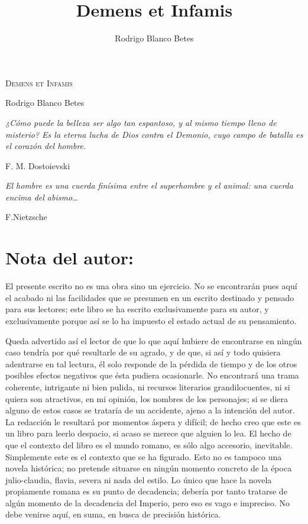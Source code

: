 \documentclass[11pt,openany]{book}
\title{\Huge Demens et Infamis}
\author{Rodrigo Blanco Betes}
\date{}
\begin{document}
\frontmatter
\begin{titlepage}
  \centering
  \vspace*{4cm}
  {\Huge\scshape Demens et Infamis\par}
  \vspace{1.5cm}
  {\Large Rodrigo Blanco Betes\par}
  \vfill
\end{titlepage}

\cleardoublepage
\thispagestyle{empty}
\vspace*{6cm}
\begin{flushright}
  \textit{¿Cómo puede la belleza ser algo tan espantoso, y al mismo tiempo lleno de misterio? Es la eterna lucha de Dios contra el Demonio, cuyo campo de batalla es el corazón del hombre.}

  F. M. Dostoievski 

\hfill

  \textit{El hombre es una cuerda finísima entre el superhombre y el animal: una cuerda encima del abismo\dots}

  F.Nietzsche 

\end{flushright}
\newpage


\section*{Nota del autor:}

El presente escrito no es una obra sino un ejercicio. No se encontrarán pues aquí el acabado ni las facilidades que se presumen en un escrito destinado y pensado para sus lectores; este libro se ha escrito exclusivamente para su autor, y exclusivamente porque así se lo ha impuesto el estado actual de su pensamiento.  

Queda advertido así el lector de que lo que aquí hubiere de encontrarse en ningún caso tendría por qué resultarle de su agrado, y de que, si así y todo quisiera adentrarse en tal lectura, él solo responde de la pérdida de tiempo y de los otros posibles efectos negativos que ésta pudiera ocasionarle. No encontrará una trama coherente, intrigante ni bien pulida, ni recursos literarios grandilocuentes, ni si quiera son atractivos, en mi opinión, los nombres de los personajes; si se diera alguno de estos casos se trataría de un accidente, ajeno a la intención del autor. La redacción le resultará por momentos áspera y difícil; de hecho creo que este es un libro para leerlo despacio, si acaso se merece que alguien lo lea. El hecho de que el contexto del libro es el mundo romano, es sólo algo accesorio, inevitable. Simplemente este es el contexto que se ha figurado. Esto no es tampoco una novela histórica; no pretende situarse en ningún momento concreto de la época julio-claudia, flavia, severa ni nada del estilo. Lo único que hace la novela propiamente romana es su punto de decadencia; debería por tanto tratarse de algún momento de la decadencia del Imperio, pero eso es vago e impreciso. No debe venirse aquí, en suma, en busca de precisión histórica. 
\end{document}

